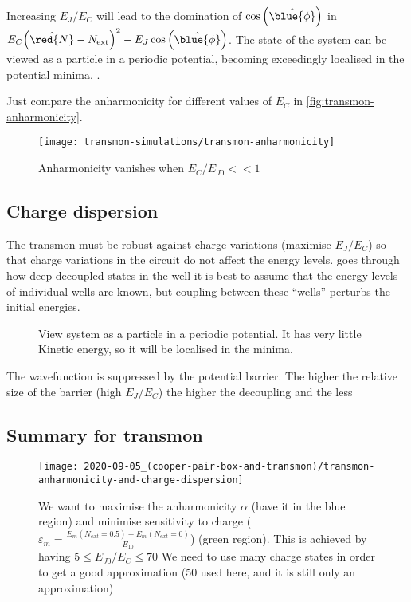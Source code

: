 \noindent  Increasing  $E_J/E_C$  will  lead  to  the  domination  of
$\cos\left(\hat{\blue{\phi}}\right)$                               in
$E_C{\left(\hat{\red{N}}-N_\text{ext}\right)^2}-
E_J\cos\left(\hat{\blue{\phi}}\right)$. The  state of the  system can
be viewed as a particle in a periodic potential, becoming exceedingly
localised  in  the  potential minima.   .

\noindent  Just compare  the  anharmonicity for  different values  of
$E_C$ in \autoref{fig:transmon-anharmonicity}.

\begin{figure}[h]
  \centering
  \texttt{[image: transmon-simulations/transmon-anharmonicity]}
  \caption{\small         Anharmonicity         vanishes         when
    $E_{C}/E_{J0} << 1$\label{fig:transmon-anharmonicity}}
\end{figure}

\subsection{Charge dispersion}
\label{sec:charge-dispersion}

The  transmon  must be  robust  against  charge variations  (maximise
$E_J/E_C$) so that charge variations in the circuit do not affect the
energy levels.  goes through how deep decoupled
states in  the well it  is best to assume  that the energy  levels of
individual  wells are  known,  but coupling  between these  ``wells''
perturbs the initial energies.

\begin{figure}[h]
  \centering {}
  \caption{\small View system as a  particle in a periodic potential.
    It has very little Kinetic energy, so it will be localised in the
    minima.\label{fig:wavefunction_transmon}}
\end{figure}

The wavefunction is suppressed by  the potential barrier.  The higher
the  relative size  of the  barrier (high  $E_J/E_C$) the  higher the
decoupling and the less

\subsection{Summary for transmon}
\label{sec:summary-transmon}

\begin{figure}[h]
  \centering
  \texttt{[image: 2020-09-05\_(cooper-pair-box-and-transmon)/transmon-anharmonicity-and-charge-dispersion]}
  \caption{\small  We want  to  maximise  the anharmonicity  $\alpha$
    (have it in  the blue region) and minimise  sensitivity to charge
    ($\varepsilon_m         =        \frac{E_m(N_{ext}=0.5)         -
      E_m(N_{ext}=0)}{E_{10}}$) (green region).   This is achieved by
    having  $5 \le  E_{J0}/E_C \le  70$ We  need to  use many  charge
    states in order to get a good approximation (50 used here, and it
    is                 still                  only                 an
    approximation)\label{fig:transmon-anharmonicity-and-charge-dispersion}}
\end{figure}


